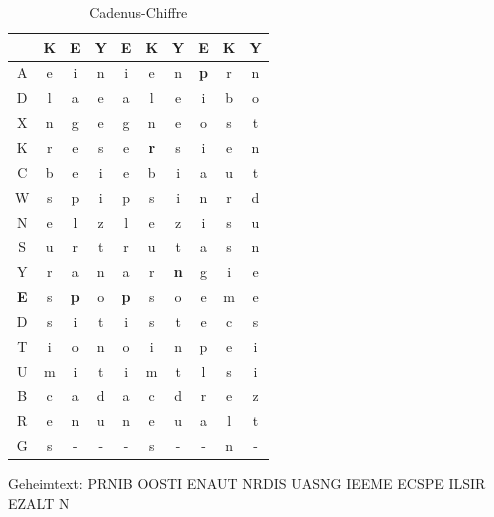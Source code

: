 \begin{refsegment}
\begin{itemize}
   \begin{table}[ht]
   \begin{center}
   \begin{tabular}{|c|ccc|ccc|ccc|}
   \hline
	  & K & \textbf{E} & Y & \textbf{E} & K & Y & \textbf{E} & K & Y\\
   \hline
	A & e & i & n & i & e & n & \textbf{p} & r & n\\
	D & l & a & e & a & l & e & i & b & o\\
	X & n & g & e & g & n & e & o & s & t\\
	K & r & e & s & e & \textbf{r} & s & i & e & n\\
	C & b & e & i & e & b & i & a & u & t\\
	W & s & p & i & p & s & i & n & r & d\\
	N & e & l & z & l & e & z & i & s & u\\
	S & u & r & t & r & u & t & a & s & n\\
	Y & r & a & n & a & r & \textbf{n} & g & i & e\\
	\textbf{E} & s & \textbf{p} & o & \textbf{p} & s & o & e & m & e\\
	D & s & i & t & i & s & t & e & c & s\\
	T & i & o & n & o & i & n & p & e & i\\	
	U & m & i & t & i & m & t & l & s & i\\
	B & c & a & d & a & c & d & r & e & z\\
	R & e & n & u & n & e & u & a & l & t\\
	G & s & - & - & - & s & - & - & n & -\\
   \hline
   \end{tabular}
   \caption[Cadenus]{Cadenus-Chiffre\footnotemark}
   \label{PaP_Cadenus-table-reference}
   \end{center}
   \end{table}%

   Geheimtext: PRNIB OOSTI ENAUT NRDIS UASNG IEEME ECSPE ILSIR EZALT N\\


\end{itemize}
\end{refsegment}
